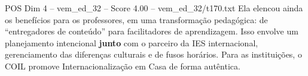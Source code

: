 \begin{textsample}{POS Dim 4 – vem\_ed\_32 – Score 4.00 – vem\_ed\_32/t170.txt}
Ela elencou ainda os benefícios para os professores, em uma transformação pedagógica: de “entregadores de conteúdo” para facilitadores de aprendizagem.
Isso envolve um planejamento intencional \textbf{junto} com o parceiro da IES internacional, gerenciamento das diferenças culturais e de fusos horários.
Para as instituições, o COIL promove Internacionalização em Casa de forma autêntica.

\end{textsample}

